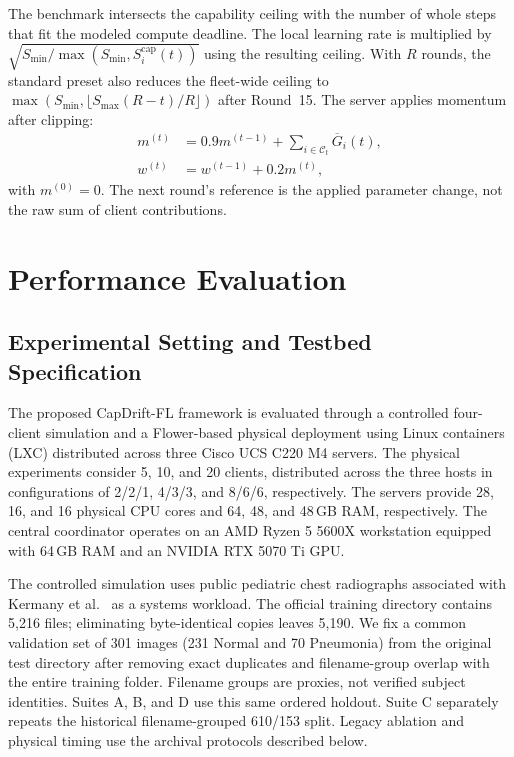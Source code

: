 \documentclass[conference]{IEEEtran}
\begin{document}
The benchmark intersects the capability ceiling with the number of whole steps that fit the modeled compute deadline. The local learning rate is multiplied by $\sqrt{S_{\min}/\max(S_{\min},S_i^{\mathrm{cap}}(t))}$ using the resulting ceiling. With $R$ rounds, the standard preset also reduces the fleet-wide ceiling to $\max(S_{\min},\lfloor S_{\max}(R-t)/R\rfloor)$ after Round~15. The server applies momentum after clipping:
\begin{align}
m^{(t)}&=0.9m^{(t-1)}+\sum_{i\in\mathcal{C}_t}\overline G_i(t),\nonumber\\
w^{(t)}&=w^{(t-1)}+0.2m^{(t)},
\end{align}
with $m^{(0)}=0$. The next round's reference is the applied parameter change, not the raw sum of client contributions.

\section{Performance Evaluation}
\label{sec:eval}

\subsection{Experimental Setting and Testbed Specification}
\label{subsec:testbed}

The proposed CapDrift-FL framework is evaluated through a controlled four-client simulation and a Flower-based physical deployment using Linux
containers (LXC) distributed across three Cisco UCS C220 M4 servers. The physical experiments consider 5, 10, and 20 clients, distributed
across the three hosts in configurations of 2/2/1, 4/3/3, and 8/6/6, respectively. The servers provide 28, 16, and 16 physical CPU cores and 64, 48, and 48\,GB RAM, respectively.
The central coordinator operates on an AMD Ryzen 5 5600X workstation equipped with 64\,GB RAM and an NVIDIA RTX 5070 Ti GPU.

The controlled simulation uses public pediatric chest radiographs associated with Kermany et al.~\cite{kermany2018} as a systems workload. The official training directory contains 5,216 files; eliminating byte-identical copies leaves 5,190. We fix a common validation set of 301 images (231 Normal and 70 Pneumonia) from the original test directory after removing exact duplicates and filename-group overlap with the entire training folder. Filename groups are proxies, not verified subject identities. Suites A, B, and D use this same ordered holdout. Suite C separately repeats the historical filename-grouped 610/153 split. Legacy ablation and physical timing use the archival protocols described below.
\end{document}
